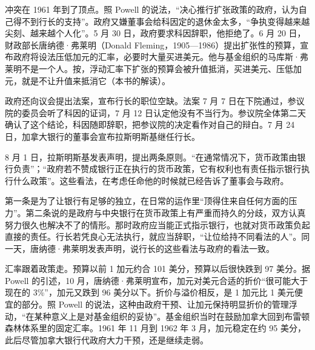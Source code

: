 冲突在 1961 年到了顶点。照 Powell 的说法，“决心推行扩张政策的政府，认为自己得不到行长的支持”\cite{powell2005}。政府又嫌董事会给科因定的退休金太多，“争执变得越来越尖刻、越来越个人化”\cite{powell2005}。5 月 30 日，政府要求科因辞职，他拒绝了\cite{powell2005}。6 月 20 日，财政部长唐纳德·弗莱明（Donald Fleming，1905—1986）提出扩张性的预算，宣布政府将设法压低加元的汇率，必要时大量买进美元\cite{powell2005,loc37}。他与基金组织的马库斯·弗莱明不是一个人。按，浮动汇率下扩张的预算会被升值抵消，买进美元、压低加元，就是不让升值来抵消它（本书的解读）。

政府还向议会提出法案，宣布行长的职位空缺\cite{powell2005}。法案 7 月 7 日在下院通过，参议院的委员会听了科因的证词，7 月 12 日认定他没有不当行为\cite{powell2005}。参议院全体第二天确认了这个结论，科因随即辞职，把参议院的决定看作对自己的辩白\cite{powell2005,boc1961}。7 月 24 日，加拿大银行的董事会宣布拉斯明斯基继任行长\cite{boc1961}。

8 月 1 日，拉斯明斯基发表声明，提出两条原则\cite{boc1961}。“在通常情况下，货币政策由银行负责”；“政府若不赞成银行正在执行的货币政策，它有权利也有责任指示银行执行什么政策”\cite{boc1961}。这些看法，在考虑任命他的时候就已经告诉了董事会与政府\cite{boc1961}。

第一条是为了让银行有足够的独立，在日常的运作里“顶得住来自任何方面的压力”\cite{boc1961}。第二条说的是政府与中央银行在货币政策上有严重而持久的分歧，双方认真努力很久也解决不了的情形\cite{boc1961}。那时政府应当能正式指示银行，也就对货币政策负起直接的责任\cite{boc1961}。行长若凭良心无法执行，就应当辞职，“让位给持不同看法的人”\cite{boc1961}。同一天，唐纳德·弗莱明发表声明，说行长的这些看法与政府的看法一致\cite{boc1961}。

汇率跟着政策走。预算以前 1 加元约合 101 美分，预算以后很快跌到 97 美分\cite{powell2005}。据 Powell 的引述，10 月，唐纳德·弗莱明宣布，加元对美元合适的折价“很可能大于现在的 3\%”，加元又跌到 96 美分以下\cite{powell2005}。折价与溢价相反，是 1 加元比 1 美元便宜的部分。照 Powell 的说法，这种由政府干预、让加元保持明显折价的管理浮动，“在某种意义上是对基金组织的妥协”\cite{powell2005}。基金组织当时在鼓励加拿大回到布雷顿森林体系里的固定汇率\cite{powell2005}。1961 年 11 月到 1962 年 3 月，加元稳定在约 95 美分，此后尽管加拿大银行代政府大力干预，还是继续走弱\cite{powell2005}。


